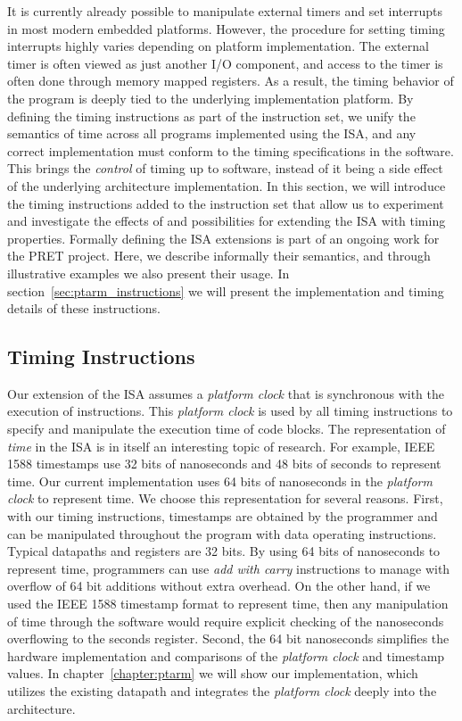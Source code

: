 It is currently already possible to manipulate external timers and set interrupts in most modern embedded platforms.
However, the procedure for setting timing interrupts highly varies depending on platform implementation.
The external timer is often viewed as just another I/O component, and access to the timer is often done through memory mapped registers.
As a result, the timing behavior of the program is deeply tied to the underlying implementation platform.
By defining the timing instructions as part of the instruction set, we unify the semantics of time across all programs implemented using the ISA, and any correct implementation must conform to the timing specifications in the software.
This brings the \emph{control} of timing up to software, instead of it being a side effect of the underlying architecture implementation.  
In this section, we will introduce the timing instructions added to the instruction set that allow us to experiment and investigate the effects of and possibilities for extending the ISA with timing properties.
Formally defining the ISA extensions is part of an ongoing work for the PRET project.
Here, we describe informally their semantics, and through illustrative examples we also present their usage. 
In section~\ref{sec:ptarm_instructions} we will present the implementation and timing details of these instructions.

\subsection{Timing Instructions}
Our extension of the ISA assumes a \emph{platform clock} that is synchronous with the execution of instructions.
This \emph{platform clock} is used by all timing instructions to specify and manipulate the execution time of code blocks.
The representation of \emph{time} in the ISA is in itself an interesting topic of research.
For example, IEEE 1588  timestamps use 32 bits of nanoseconds and 48 bits of seconds to represent time.    
Our current implementation uses 64 bits of nanoseconds in the \emph{platform clock} to represent time. 
We choose this representation for several reasons. 
First, with our timing instructions, timestamps are obtained by the programmer and can be manipulated throughout the program with data operating instructions.
Typical datapaths and registers are 32 bits. 
By using 64 bits of nanoseconds to represent time, programmers can use \emph{add with carry} instructions to manage with overflow of 64 bit additions without extra overhead. 
On the other hand, if we used the IEEE 1588 timestamp format to represent time, then any manipulation of time through the software would require explicit checking of the nanoseconds overflowing to the seconds register.
Second, the 64 bit nanoseconds simplifies the hardware implementation and comparisons of the \emph{platform clock} and timestamp values.
In chapter~\ref{chapter:ptarm} we will show our implementation, which utilizes the existing datapath and integrates the \emph{platform clock} deeply into the architecture. 

